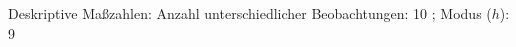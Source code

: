 				\label{tableValues:afec05o_g1r}
				\vspace*{-\baselineskip}
                    \begin{noten}
                	    \note{} Deskriptive Maßzahlen:
                	    Anzahl unterschiedlicher Beobachtungen: 10%
                	    ; 
                	      Modus ($h$): 9
                     \end{noten}

